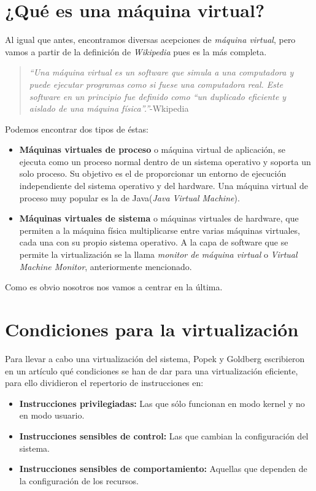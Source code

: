 \section{¿Qué es una máquina virtual?}

\noindent Al igual que antes, encontramos diversas acepciones de \emph{máquina virtual}, pero vamos a partir de la definición de \emph{Wikipedia} pues es la más completa.

\begin{quote}
\emph{\textquotedblleft Una máquina virtual es un software que simula a una computadora y puede ejecutar programas como si fuese una computadora real. Este software en un principio fue definido como \textquotedblleft un duplicado eficiente y aislado de una máquina física\textquotedblright.\textquotedblright}-Wkipedia\cite{defmaqvirwiki}
\end{quote}

\noindent Podemos encontrar dos tipos de éstas:

\begin{itemize}
\item \textbf{Máquinas virtuales de proceso} o máquina virtual de aplicación, se ejecuta como un proceso normal dentro de un sistema operativo y soporta un solo proceso. Su objetivo es el de proporcionar un entorno de ejecución independiente del sistema operativo y del hardware. Una máquina virtual de proceso muy popular es la de Java(\emph{Java Virtual Machine}).
\item \textbf{Máquinas virtuales de sistema} o máquinas virtuales de hardware, que permiten a la máquina física multiplicarse entre varias máquinas virtuales, cada una con su propio sistema operativo. A la capa de software que se permite la virtualización se la llama \emph{monitor de máquina virtual} o \emph{Virtual Machine Monitor}, anteriormente mencionado.
\end{itemize}

\noindent Como es obvio nosotros nos vamos a centrar en la última.

\section{Condiciones para la virtualización}

\noindent Para llevar a cabo una virtualización del sistema, Popek y Goldberg escribieron en un artículo\cite{reqvir} qué condiciones se han de dar para una virtualización eficiente, para ello dividieron el repertorio de instrucciones en:
\begin{itemize}
\item \textbf{Instrucciones privilegiadas:} Las que sólo funcionan en modo kernel y no en modo usuario.
\item \textbf{Instrucciones sensibles de control:} Las que cambian la configuración del sistema.
\item \textbf{Instrucciones sensibles de comportamiento:} Aquellas que dependen de la configuración de los recursos. 
\end{itemize}

